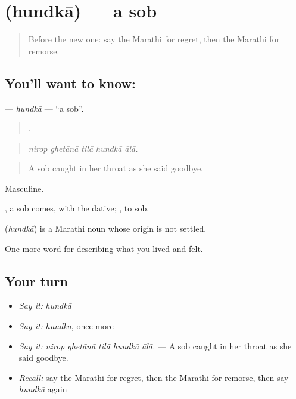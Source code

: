 \section[\texorpdfstring{\mr{हुंदका} (hundkā)}{हुंदका (hundkā)}]{ (hundkā) — a sob}

\label{lesson:MR-C457-hundka}



\begin{quote}
Before the new one: say the Marathi for regret, then the Marathi for remorse.
\end{quote}

\subsection*{You'll want to know: }
\textbf{} — \emph{hundkā} — \textquotedblleft{}a sob\textquotedblright{}.

\begin{quote}
    .
\end{quote}

\begin{quote}
\emph{nirop ghetānā tilā hundkā ālā.}
\end{quote}

\begin{quote}
A sob caught in her throat as she said goodbye.
\end{quote}

Masculine.

 , a sob comes, with the dative;  , to sob.

\begin{cousinweb}
\textbf{} (\emph{hundkā}) is a Marathi noun whose origin is not settled.
\end{cousinweb}

\begin{grammarlens}[title={What you've built}]
One more word for describing what you lived and felt.
\end{grammarlens}

\subsection*{Your turn}
\begin{itemize}
\raggedright
  \item \emph{Say it:} \emph{hundkā}
  \item \emph{Say it:} \emph{hundkā}, once more
  \item \emph{Say it:} \emph{nirop ghetānā tilā hundkā ālā.} — A sob caught in her throat as she said goodbye.
  \item \emph{Recall:} say the Marathi for regret, then the Marathi for remorse, then say \emph{hundkā} again
\end{itemize}

